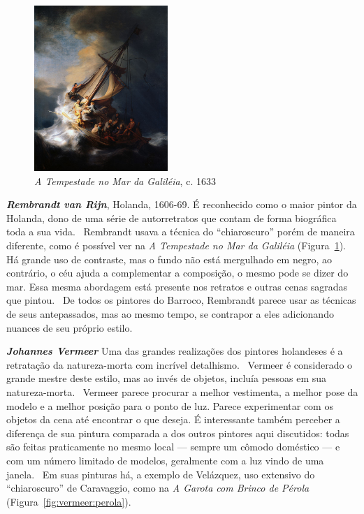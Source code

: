 \begin{figure}
  \begin{center}
    \includegraphics[width=0.45\textwidth]{figs/rembrandt_tempestade.png}
  \end{center}
  \caption{\emph{A Tempestade no Mar da Galiléia}, c. 1633}
  \label{fig:rembrandt:tempestade}
\end{figure}

\textbf{\emph{Rembrandt van Rijn}}, Holanda, 1606-69. É reconhecido como o maior
pintor da Holanda, dono de uma série de autorretratos que contam de forma
biográfica toda a sua vida.~\cite{van1999, gombrich} Rembrandt usava a técnica
do ``chiaroscuro'' porém de maneira diferente, como é possível ver na \textit{A
  Tempestade no Mar da Galiléia} (Figura~\ref{fig:rembrandt:tempestade}).  Há
grande uso de contraste, mas o fundo não está mergulhado em negro, ao contrário,
o céu ajuda a complementar a composição, o mesmo pode se dizer do mar. Essa
mesma abordagem está presente nos retratos e outras cenas sagradas que
pintou.~\cite{van1997} De todos os pintores do Barroco, Rembrandt parece usar as
técnicas de seus antepassados, mas ao mesmo tempo, se contrapor a eles
adicionando nuances de seu próprio estilo.

\textbf{\emph{Johannes Vermeer}} Uma das grandes realizações dos pintores
holandeses é a retratação da natureza-morta com incrível
detalhismo.~\cite{wadum} Vermeer é considerado o grande mestre deste estilo, mas
ao invés de objetos, incluía pessoas em sua natureza-morta.~\cite{gombrich}
Vermeer parece procurar a melhor vestimenta, a melhor pose da modelo e a melhor
posição para o ponto de luz. Parece experimentar com os objetos da cena até
encontrar o que deseja. É interessante também perceber a diferença de sua
pintura comparada a dos outros pintores aqui discutidos: todas são feitas
praticamente no mesmo local --- sempre um cômodo doméstico --- e com um número
limitado de modelos, geralmente com a luz vindo de uma janela.~\cite{wadum1998}
Em suas pinturas há, a exemplo de Velázquez, uso extensivo do ``chiaroscuro'' de
Caravaggio, como na \textit{A Garota com Brinco de Pérola}
(Figura~\ref{fig:vermeer:perola}).

